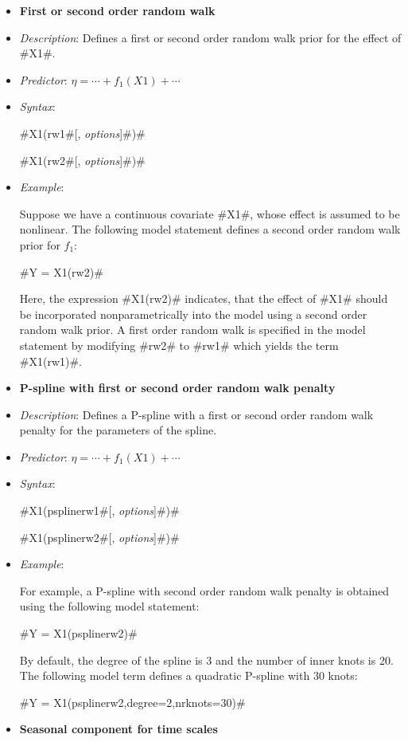 \begin{itemize}
\item[]{\bf\sffamily First or second order random walk}

\item[] {\em Description}: Defines a first or second order random walk prior for the effect of #X1#.
\item[] {\em Predictor}: $\eta = \cdots + f_1(X1) + \cdots $
\item[] {\em Syntax}:

#X1(rw1#[, {\em options}]#)#

#X1(rw2#[, {\em options}]#)#
\item[] {\em Example}:

Suppose we have a continuous covariate #X1#, whose effect is
assumed to be nonlinear. The following model statement defines a
second order random walk prior for $f_1$:

#Y = X1(rw2)#

Here, the expression #X1(rw2)# indicates, that the effect of #X1#
should be incorporated nonparametrically into the model using a
second order random walk prior. A first order random walk is
specified in the model statement by modifying #rw2# to #rw1# which
yields the term #X1(rw1)#.

\item[] {\bf\sffamily P-spline with first or second order random
walk penalty}

\item[] {\em Description}: Defines a P-spline with a first or second order random walk penalty for
the parameters of the spline.
\item[] {\em Predictor}: $\eta =  \cdots + f_1(X1) + \cdots$
\item[] {\em Syntax}:

#X1(psplinerw1#[, {\em options}]#)#

#X1(psplinerw2#[, {\em options}]#)#
\item[] {\em Example}:

For example, a P-spline with second order random walk penalty is
obtained using the following model statement:

#Y = X1(psplinerw2)#

By default, the degree of the spline is 3 and the number of inner
knots is 20. The following model term defines a quadratic P-spline
with 30 knots:

#Y = X1(psplinerw2,degree=2,nrknots=30)#

\item[]{\bf\sffamily Seasonal component for time scales}


\end{itemize}
